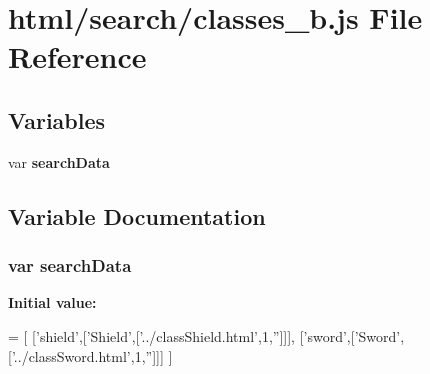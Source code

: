 \section{html/search/classes\-\_\-b.js File Reference}
\label{classes__b_8js}
\subsection*{Variables}
\begin{DoxyCompactItemize}
\item 
var {\bf search\-Data}
\end{DoxyCompactItemize}


\subsection{Variable Documentation}
\subsubsection[{search\-Data}]{\setlength{\rightskip}{0pt plus 5cm}var search\-Data}\label{classes__b_8js_ad01a7523f103d6242ef9b0451861231e}
{\bfseries Initial value\-:}
\begin{DoxyCode}
=
[
  [\textcolor{stringliteral}{'shield'},[\textcolor{stringliteral}{'Shield'},[\textcolor{stringliteral}{'../classShield.html'},1,\textcolor{stringliteral}{''}]]],
  [\textcolor{stringliteral}{'sword'},[\textcolor{stringliteral}{'Sword'},[\textcolor{stringliteral}{'../classSword.html'},1,\textcolor{stringliteral}{''}]]]
]
\end{DoxyCode}

